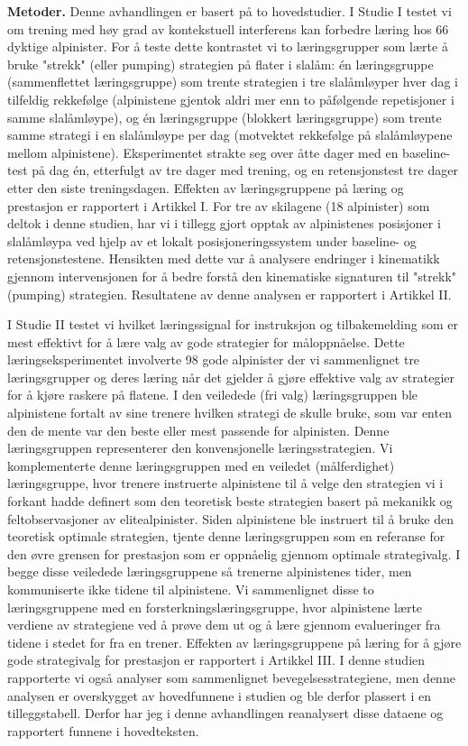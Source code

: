 \textbf{Metoder.} Denne avhandlingen er basert på to hovedstudier. I Studie I testet vi om trening med høy grad av kontekstuell interferens kan forbedre læring hos 66 dyktige alpinister. For å teste dette kontrastet vi to læringsgrupper som lærte å bruke "strekk" (eller pumping) strategien på flater i slalåm: én læringsgruppe (sammenflettet læringsgruppe) som trente strategien i tre slalåmløyper hver dag i tilfeldig rekkefølge (alpinistene gjentok aldri mer enn to påfølgende repetisjoner i samme slalåmløype), og én læringsgruppe (blokkert læringsgruppe) som trente samme strategi i en slalåmløype per dag (motvektet rekkefølge på slalåmløypene mellom alpinistene). Eksperimentet strakte seg over åtte dager med en baseline-test på dag én, etterfulgt av tre dager med trening, og en retensjonstest tre dager etter den siste treningsdagen. Effekten av læringsgruppene på læring og prestasjon er rapportert i Artikkel I.  For tre av skilagene (18 alpinister) som deltok i denne studien, har vi i tillegg gjort opptak av alpinistenes posisjoner i slalåmløypa ved hjelp av et lokalt posisjoneringssystem under baseline- og retensjonstestene. Hensikten med dette var å analysere endringer i kinematikk gjennom intervensjonen for å bedre forstå den kinematiske signaturen til "strekk" (pumping) strategien. Resultatene av denne analysen er rapportert i Artikkel II.

I Studie II testet vi hvilket læringssignal for instruksjon og tilbakemelding som er mest effektivt for å lære valg av gode strategier for måloppnåelse. Dette læringseksperimentet involverte 98 gode alpinister der vi sammenlignet tre læringsgrupper og deres læring når det gjelder å gjøre effektive valg av strategier for å kjøre raskere på flatene. I den veiledede (fri valg) læringsgruppen ble alpinistene fortalt av sine trenere hvilken strategi de skulle bruke, som var enten den de mente var den beste eller mest passende for alpinisten. Denne læringsgruppen representerer den konvensjonelle læringsstrategien. Vi komplementerte denne læringsgruppen med en veiledet (målferdighet) læringsgruppe, hvor trenere instruerte alpinistene til å velge den strategien vi i forkant hadde definert som den teoretisk beste strategien basert på mekanikk og feltobservasjoner av elitealpinister. Siden alpinistene ble instruert til å bruke den teoretisk optimale strategien, tjente denne læringsgruppen som en referanse for den øvre grensen for prestasjon som er oppnåelig gjennom optimale strategivalg. I begge disse veiledede læringsgruppene så trenerne alpinistenes tider, men kommuniserte ikke tidene til alpinistene. Vi sammenlignet disse to læringsgruppene med en forsterkningslæringsgruppe, hvor alpinistene lærte verdiene av strategiene ved å prøve dem ut og å lære gjennom evalueringer fra tidene i stedet for fra en trener. Effekten av læringsgruppene på læring for å gjøre gode strategivalg for prestasjon er rapportert i Artikkel III. I denne studien rapporterte vi også analyser som sammenlignet bevegelsesstrategiene, men denne analysen er overskygget av hovedfunnene i studien og ble derfor plassert i en tilleggstabell. Derfor har jeg i denne avhandlingen reanalysert disse dataene og rapportert funnene i hovedteksten.

